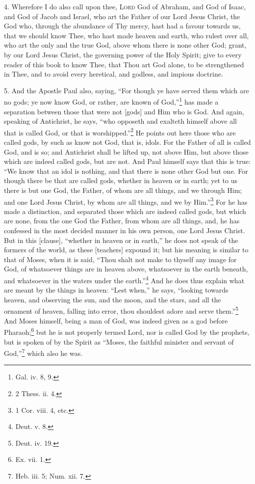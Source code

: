 4. Wherefore I do also call upon thee, \textsc{Lord} God of Abraham, and God of Isaac, and God of Jacob and Israel, who art the Father of our Lord Jesus Christ, the God who, through the abundance of Thy mercy, hast had a favour towards us, that we should know Thee, who hast made heaven and earth, who rulest over all, who art the only and the true God, above whom there is none other God; grant, by our Lord Jesus Christ, the governing power of the Holy Spirit; give to every reader of this book to know Thee, that Thou art God alone, to be strengthened in Thee, and to avoid every heretical, and godless, and impious doctrine.

5. And the Apostle Paul also, saying, “For though ye have served them which are no gods; ye now know God, or rather, are known of God,”\footnote{Gal. iv. 8, 9.} has made a separation between those that were not [gods] and Him who is God. And again, speaking of Antichrist, he says, “who opposeth and exalteth himself above all that is called God, or that is worshipped.”\footnote{2 Thess. ii. 4.} He points out here those who are called gods, by such as know not God, that is, idols. For the Father of all is called God, and is so; and Antichrist shall be lifted up, not above Him, but above those which are indeed called gods, but are not. And Paul himself says that this is true: “We know that an idol is nothing, and that there is none other God but one. For though there be that are called gods, whether in heaven or in earth; yet to us there is but one God, the Father, of whom are all things, and we through Him; and one Lord Jesus Christ, by whom are all things, and we by Him.”\footnote{1 Cor. viii. 4, etc.} For he has made a distinction, and separated those which are indeed called gods, but which are none, from the one God the Father, from whom are all things, and, he has confessed in the most decided manner in his own person, one Lord Jesus Christ. But in this [clause], “whether in heaven or in earth,” he does not speak of the formers of the world, as these [teachers] expound it; but his meaning is similar to that of Moses, when it is said, “Thou shalt not make to thyself any image for God, of whatsoever things are in heaven above, whatsoever in the earth beneath, and whatsoever in the waters under the earth.”\footnote{Deut. v. 8.} And he does thus explain what are meant by the things in heaven: “Lest when,” he says, “looking towards heaven, and observing the sun, and the moon, and the stars, and all the ornament of heaven, falling into error, thou shouldest adore and serve them.”\footnote{Deut. iv. 19.} And Moses himself, being a man of God, was indeed given as a god before Pharaoh;\footnote{Ex. vii. 1.} but he is not properly termed Lord, nor is called God by the prophets, but is spoken of by the Spirit as “Moses, the faithful minister and servant of God,”\footnote{Heb. iii. 5; Num. xii. 7.} which also he was.

